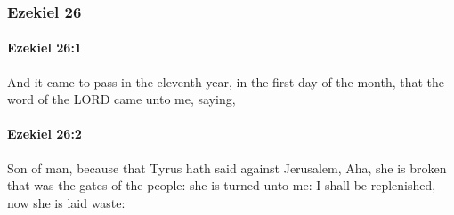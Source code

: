 	\subsubsection{Ezekiel 26} %
		\label{EZEKIEL-26}

		\paragraph{Ezekiel 26:1} %
			\label{EZEKIEL-26-1}

			And it came to pass in the eleventh year, in the first day of the month, that the word of the LORD came unto me, saying,


		\paragraph{Ezekiel 26:2} %
			\label{EZEKIEL-26-2}

			Son of man, because that Tyrus hath said against Jerusalem, Aha, she is broken that was the gates of the people: she is turned unto me: I shall be replenished, now she is laid waste:

